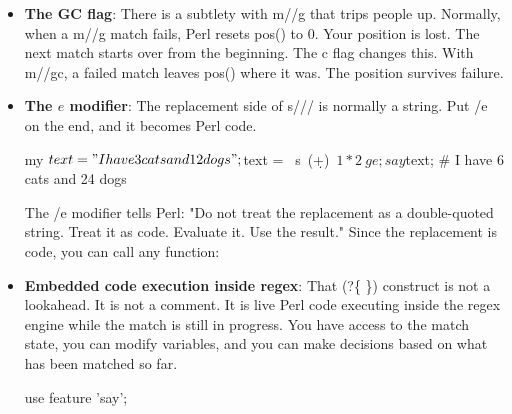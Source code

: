 \documentclass{report}
\begin{document}
\begin{itemize}
\begin{perlcode}
                # without \G, the next match could skip ahead
                # WITH \G, it must match right at position 3
                $str =~ m~\G(\w+)~g;    # fails! position 3 is a space, not \w
            \end{perlcode}
            \bigbreak \noindent 
            \begin{perlcode}
                my $str = "aaa bbb ccc";

                $str =~ m~\G(\w+)~g;
                say $1;          
                say pos($str);  

                $str =~ m~\G\s(\w+)~g;    
                say $1;                 # bbb
                say pos($str);          # 7
            \end{perlcode}
        \item \textbf{The GC flag}: There is a subtlety with m//g that trips people up. Normally, when a m//g match fails, Perl resets pos() to 0. Your position is lost. The next match starts over from the beginning.
            \bigbreak \noindent 
            The c flag changes this. With m//gc, a failed match leaves pos() where it was. The position survives failure.
        \item \textbf{The $e$ modifier}:  The replacement side of s/// is normally a string. Put /e on the end, and it becomes Perl code.
            \bigbreak \noindent 
            \begin{perlcode}
                my $text = "I have 3 cats and 12 dogs";

                $text =~ s~(\d+)~$1 * 2~ge;

                say $text;
                # I have 6 cats and 24 dogs
            \end{perlcode}
            \bigbreak \noindent 
            The /e modifier tells Perl: "Do not treat the replacement as a double-quoted string. Treat it as code. Evaluate it. Use the result." Since the replacement is code, you can call any function:
        \item \textbf{Embedded code execution inside regex}: That (?\{ \}) construct is not a lookahead. It is not a comment. It is live Perl code executing inside the regex engine while the match is still in progress. You have access to the match state, you can modify variables, and you can make decisions based on what has been matched so far.
            \bigbreak \noindent 
            \begin{perlcode}
                use feature 'say';


\end{perlcode}
\end{itemize}
\end{document}
